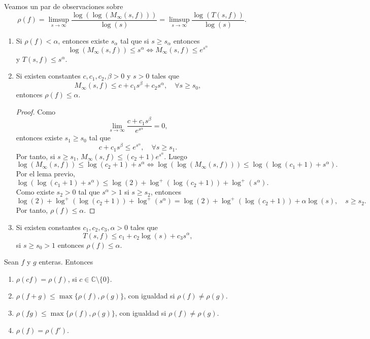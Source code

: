\begin{remark}
    Veamos un par de observaciones sobre
    $$\rho(f) = \limsup_{s \to \infty} \frac{\log(\log(M_\infty(s, f)))}{\log(s)} = \limsup_{s \to \infty} \frac{\log(T(s, f))}{\log(s)}.$$
    \begin{enumerate}
        \item Si $\rho(f) < \alpha$, entonces existe $s_\alpha$ tal que si $s \geq s_\alpha$ entonces
              $$\log(M_\infty(s, f)) \leq s^\alpha \Leftrightarrow M_\infty(s, f) \leq e^{s^\alpha}$$
              y $T(s, f) \leq s^\alpha$.

        \item Si existen constantes $c, c_1, c_2, \beta > 0$ y $s > 0$ tales que
              $$M_\infty(s, f) \leq c + c_1s^\beta + c_2s^\alpha, \quad \forall s \geq s_0,$$
              entonces $\rho(f) \leq \alpha$.
              \begin{proof}
                  Como
                  $$\lim_{s \to \infty} \frac{c + c_1s^\beta}{e^{s^\alpha}} = 0,$$
                  entonces existe $s_1 \geq s_0$ tal que
                  $$c + c_1s^\beta \leq e^{s^\alpha}, \quad \forall s \geq s_1.$$
                  Por tanto, si $s \geq s_1$, $M_\infty(s, f) \leq (c_2+1)e^{s^\alpha}$.
                  Luego
                  $$\log(M_\infty(s, f)) \leq \log(c_2+1) + s^\alpha \Leftrightarrow \log(\log(M_\infty(s, f))) \leq \log(\log(c_1+1) +  s^\alpha).$$
                  Por el lema previo,
                  $$\log(\log(c_1+1) +  s^\alpha) \leq \log(2) + \log^+(\log(c_2+1)) + \log^+(s^\alpha).$$
                  Como existe $s_2 > 0$ tal que $s^\alpha > 1$ si $s \geq s_2$, entonces
                  $$\log(2) + \log^+(\log(c_2+1)) + \log^+(s^\alpha) = \log(2) + \log^+(\log(c_2+1)) + \alpha\log(s), \quad s \geq s_2.$$
                  Por tanto, $\rho(f) \leq \alpha$.
              \end{proof}

        \item Si existen constantes $c_1, c_2, c_3, \alpha > 0$ tales que
              $$T(s, f) \leq c_1 + c_2\log(s) + c_3s^\alpha,$$
              si $s \geq s_0 > 1$ entonces $\rho(f) \leq \alpha$.
    \end{enumerate}
\end{remark}

\begin{theorem}
    Sean $f$ y $g$ enteras.
    Entonces
    \begin{enumerate}
        \item $\rho(cf) = \rho(f)$, si $c \in \mathbb{C} \setminus \{0\}$.
        \item $\rho(f+g) \leq \max\{\rho(f), \rho(g)\}$, con igualdad si $\rho(f) \neq \rho(g)$.
        \item $\rho(fg) \leq \max\{\rho(f), \rho(g)\}$, con igualdad si $\rho(f) \neq \rho(g)$.
        \item $\rho(f) = \rho(f')$.
    \end{enumerate}
\end{theorem}

